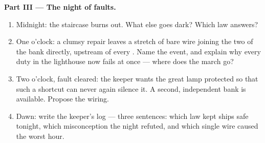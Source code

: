 \begin{problem}
\medskip\noindent\textbf{Part III --- The night of faults.}
\begin{enumerate}[resume]
  \item Midnight: the staircase  burns out. What else goes
        dark? Which law answers?
  \item One o'clock: a clumsy repair leaves a stretch of bare
        wire joining the two  of the bank directly,
        upstream of every . Name the event, and explain
        why every duty in the lighthouse now fails at once ---
        where does the march go?
  \item Two o'clock, fault cleared: the keeper wants the great
        lamp protected so that such a shortcut can never again
        silence it. A second, independent  bank is
        available. Propose the wiring.
  \item Dawn: write the keeper's log --- three sentences: which
        law kept ships safe tonight, which misconception the
        night refuted, and which single wire caused the worst
        hour.
\end{enumerate}
\end{problem}
